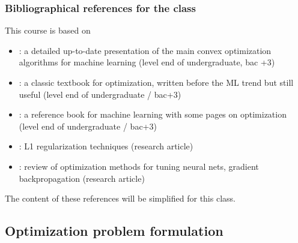 \documentclass[12pt]{beamer}
\begin{document}
\begin{frame}
\frametitle{Bibliographical references for the class}
{\small
This course is based on
\begin{itemize}
\item \cite{ravikumar17} : a detailed up-to-date presentation of the main convex optimization algorithms for machine learning (level end of undergraduate, bac +3)
\item \cite{minoux2008programmation} : a classic textbook for optimization, written before the ML trend but still useful (level end of undergraduate / bac+3)
\item \cite{bishop2006pattern} : a reference book for machine learning with some pages on optimization (level end of undergraduate / bac+3)
\item \cite{schmidt2007fast} : L1 regularization techniques (research article)
\item \cite{sun2019optimization} : review of optimization methods for tuning neural nets, gradient backpropagation (research article)
\end{itemize}
The content of these references will be simplified for this class.
} %
\end{frame}

\subsection{Optimization problem formulation}
\end{document}
